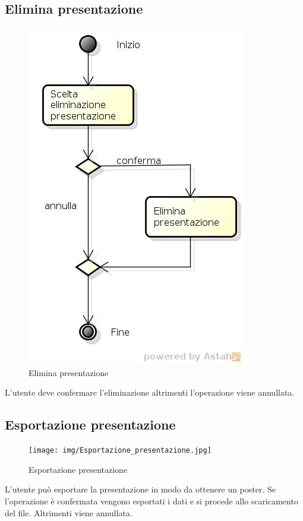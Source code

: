 \subsection{Elimina presentazione}

\begin{figure}[h!]
		\centering
		\includegraphics[scale=.2]{img/Elimina_presentazione.jpg}
		\caption{Elimina presentazione}
		\label{fig:ModelloSpy}
\end{figure}  

L'utente deve confermare l'eliminazione altrimenti l'operazione viene annullata.

\subsection{Esportazione presentazione}

\begin{figure}[h!]
		\centering
		\texttt{[image: img/Esportazione\_presentazione.jpg]}
		\caption{Esportazione presentazione}
		\label{fig:ModelloSpy}
\end{figure}

L'utente può esportare la presentazione in modo da ottenere un poster. Se l'operazione è confermata vengono esportati i dati e si procede allo scaricamento del file. Altrimenti viene annullata.

